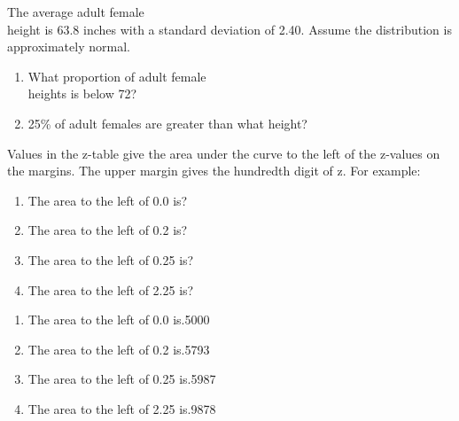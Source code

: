 \documentclass[11pt, chapterprefix=true]{scrbook}\usepackage[]{graphicx}\usepackage[]{color}
\begin{document}
\begin{exercises}
\begin{exercise}  %

The average adult female \\ height is 63.8 inches with a standard deviation of 2.40. Assume the distribution is 
approximately normal.

\begin{enumerate}
\item What proportion of adult female \\ heights is below 72?
\item 25\% of adult females are greater than what height?
\end{enumerate}

  \end{exercise}



\begin{exercise} %

Values in the z-table give the area under the curve to the left of the z-values on the margins.  The upper margin gives the hundredth digit of z.  For example:

\begin{enumerate}
\item The area to the left of 0.0 is?
\item The area to the left of 0.2 is?
\item The area to the left of 0.25 is?
\item The area to the left of 2.25 is?
\end{enumerate}

	\end{exercise}
\begin{solution}  %

\begin{enumerate}
\item The area to the left of 0.0 is.5000
\item The area to the left of 0.2 is.5793
\item The area to the left of 0.25 is.5987
\item The area to the left of 2.25 is.9878
\end{enumerate}
\end{solution}


  \begin{exercise} %


\end{exercise}
\end{exercises}
\end{document}
